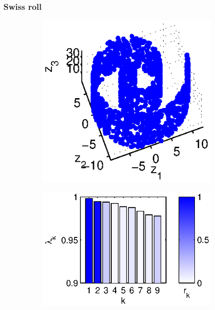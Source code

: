 \subsubsection{Swiss roll}

\begin{figure}[!t]
%
\begin{subfigure}{0.2\textwidth}
\centering
\includegraphics[width=\textwidth]{swissroll1}
\caption{}
\label{subfig:swissroll1}
\end{subfigure}
%
\begin{subfigure}{0.25\textwidth}
\centering
\includegraphics[width=\textwidth]{swissroll1_evals}

\end{subfigure}
\end{figure}
